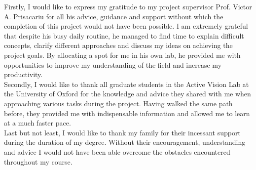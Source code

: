 \documentclass[main.tex]{subfiles}
\begin{document}
Firstly, I would like to express my gratitude to my project supervisor Prof. Victor A. Prisacariu for all his advice, guidance and support without which the completion of this project would not have been possible. I am extremely grateful that despite his busy daily routine, he managed to find time to explain difficult concepts, clarify different approaches and discuss my ideas on achieving the project goals. By allocating a spot for me in his own lab, he provided me with opportunities to improve my understanding of the field and increase my productivity.\\

Secondly, I would like to thank all graduate students in the Active Vision Lab at the University of Oxford for the knowledge and advice they shared with me when approaching various tasks during the project. Having walked the same path before, they provided me with indispensable information and allowed me to learn at a much faster pace. \\ 

Last but not least, I would like to thank my family for their incessant support during the duration of my degree. Without their encouragement, understanding and advice I would not have been able overcome the obstacles encountered throughout my course. 
\end{document}
